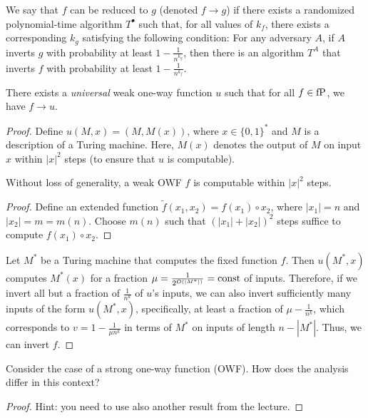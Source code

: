 \begin{definition}
    We say that $f$ can be reduced to $g$ (denoted $f \to g$) if there exists a randomized polynomial-time algorithm $T^{\bullet}$ such that, for all values of $k_f$, there exists a corresponding $k_g$ satisfying the following condition:
    For any adversary $A$, if $A$ inverts $g$ with probability at least $1 - \frac{1}{n^{k_g}}$, then there is an algorithm $T^A$ that inverts $f$ with probability at least $1 - \frac{1}{n^{k_f}}$.
\end{definition}

\begin{theorem}
    There exists a \emph{universal} weak one-way function $u$ such that for all $f \in \operatorname{fP}$, we have $f \to u$.
\end{theorem}

\begin{proof}
    Define $u(M, x) = (M, M(x))$, where $x \in \{0, 1\}^*$ and $M$ is a description of a Turing machine.
    Here, $M(x)$ denotes the output of $M$ on input $x$ within $|x|^2$ steps (to ensure that $u$ is computable).

    \begin{lemma}
        Without loss of generality, a weak OWF $f$ is computable within $|x|^2$ steps.
    \end{lemma}
    
    \begin{proof}
        Define an extended function $\tilde{f}(x_1, x_2) = f(x_1) \circ x_2$, where $|x_1| = n$ and $|x_2| = m = m(n)$.
        Choose $m(n)$ such that $(|x_1| + |x_2|)^2$ steps suffice to compute $f(x_1) \circ x_2$.
    \end{proof}

    Let $M^*$ be a Turing machine that computes the fixed function $f$.
    Then $u(M^*, x)$ computes $M^*(x)$ for a fraction $\mu = \frac{1}{2^{O(|M^{*}|)}} = \operatorname{const}$ of inputs.
    Therefore, if we invert all but a fraction of $\frac{1}{n^{k}}$ of $u$'s inputs, we can also invert sufficiently many inputs of the form $u(M^*, x)$, specifically, at least a fraction of $\mu - \frac{1}{n^{k}}$, which corresponds to $v = 1 - \frac{1}{\mu n^{k}}$ in terms of $M^*$ on inputs of length $n - |M^*|$.
    Thus, we can invert $f$.
\end{proof}

\begin{exercise}
    Consider the case of a strong one-way function (OWF).
    How does the analysis differ in this context?
\end{exercise}
\begin{proof}
	Hint: you need to use also another result from the lecture.
\end{proof}

